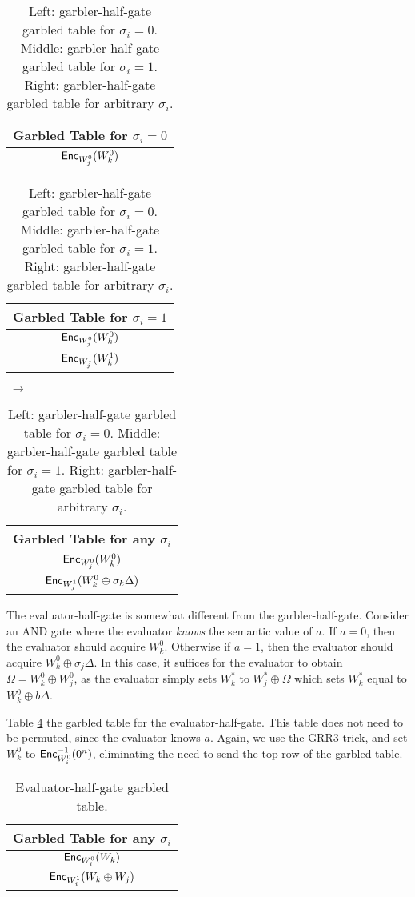 \begin{table}[]
    \centering
    \begin{tabular}{|c|}
        \hline
        Garbled Table for $\sigma_i = 0$ \\
        \hline
        $\textsf{Enc}_{W_j^0}(W_k^0)$ \\
        \hline
    \end{tabular}
    \begin{tabular}{|c|}
        \hline
        Garbled Table for $\sigma_i = 1$ \\
        \hline
        $\textsf{Enc}_{W_j^0}(W_k^0)$ \\
        $\textsf{Enc}_{W_j^1}(W_k^1)$ \\
        \hline
    \end{tabular} $\;\rightarrow$
    \begin{tabular}{|c|}
        \hline
        Garbled Table for any $\sigma_i$ \\
        \hline
        $\textsf{Enc}_{W_j^0}(W_k^0)$ \\
        $\textsf{Enc}_{W_j^1}(W_k^0 \oplus \sigma_k\Delta)$ \\
        \hline
    \end{tabular}
    \caption{Left: garbler-half-gate garbled table for $\sigma_i = 0$. Middle: garbler-half-gate garbled table for $\sigma_i = 1$. Right: garbler-half-gate garbled table for arbitrary $\sigma_i$.}
        \label{tbl:halfgate-gg-garb}
\end{table}

The evaluator-half-gate is somewhat different from the garbler-half-gate.
Consider an AND gate where the evaluator \textit{knows} the semantic value of $a$.
If $a = 0$, then the evaluator should acquire $W_k^0$. 
Otherwise if $a = 1$, then the evaluator should acquire $W_k^0 \oplus \sigma_j\Delta$.
In this case, it suffices for the evaluator to obtain $\Omega = W_k^0 \oplus W_j^0$, as the evaluator simply sets $W_k^*$ to $W_j^* \oplus \Omega$ which sets $W_k^*$ equal to $W_k^0 \oplus b\Delta$.

Table \ref{tbl:halfgate-gg-eval} the garbled table for the evaluator-half-gate.
This table does not need to be permuted, since the evaluator knows $a$.
Again, we use the GRR3 trick, and set $W_k^0$ to $\textsf{Enc}^{-1}_{W_i^0}(0^n)$, eliminating the need to send the top row of the garbled table.

\begin{table}[h]
    \label{tbl:halfgate-gg-eval}
    \centering
    \begin{tabular}{|c|}
        \hline
        Garbled Table for any $\sigma_i$ \\
        \hline
        $\textsf{Enc}_{W_i^0}(W_k)$ \\
        $\textsf{Enc}_{W_i^1}(W_k \oplus W_j)$ \\
        \hline
    \end{tabular}
    \caption{Evaluator-half-gate garbled table.}
\end{table}

